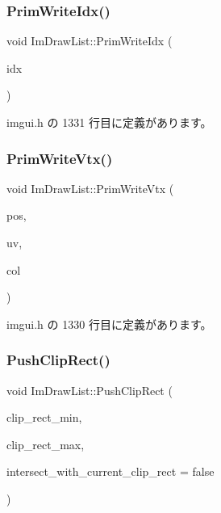 \subsubsection{\texorpdfstring{Prim\+Write\+Idx()}{PrimWriteIdx()}}
{\footnotesize\ttfamily void Im\+Draw\+List\+::\+Prim\+Write\+Idx (\begin{DoxyParamCaption}\item[{\mbox{\hyperlink{imgui_8h_afdc8744a5ac1a968b1ddfa47e13b2fa1}{Im\+Draw\+Idx}}}]{idx }\end{DoxyParamCaption})\hspace{0.3cm}{\ttfamily [inline]}}



 imgui.\+h の 1331 行目に定義があります。

\mbox{\label{struct_im_draw_list_af86de4faf6c8e978fb712ea14c5d0c5f}} 
\subsubsection{\texorpdfstring{Prim\+Write\+Vtx()}{PrimWriteVtx()}}
{\footnotesize\ttfamily void Im\+Draw\+List\+::\+Prim\+Write\+Vtx (\begin{DoxyParamCaption}\item[{const \mbox{\hyperlink{struct_im_vec2}{Im\+Vec2}} \&}]{pos,  }\item[{const \mbox{\hyperlink{struct_im_vec2}{Im\+Vec2}} \&}]{uv,  }\item[{\mbox{\hyperlink{imgui_8h_a118cff4eeb8d00e7d07ce3d6460eed36}{Im\+U32}}}]{col }\end{DoxyParamCaption})\hspace{0.3cm}{\ttfamily [inline]}}



 imgui.\+h の 1330 行目に定義があります。

\mbox{\label{struct_im_draw_list_acb34e2d3708616cae4567f3b4af06962}} 
\subsubsection{\texorpdfstring{Push\+Clip\+Rect()}{PushClipRect()}}
{\footnotesize\ttfamily void Im\+Draw\+List\+::\+Push\+Clip\+Rect (\begin{DoxyParamCaption}\item[{\mbox{\hyperlink{struct_im_vec2}{Im\+Vec2}}}]{clip\+\_\+rect\+\_\+min,  }\item[{\mbox{\hyperlink{struct_im_vec2}{Im\+Vec2}}}]{clip\+\_\+rect\+\_\+max,  }\item[{bool}]{intersect\+\_\+with\+\_\+current\+\_\+clip\+\_\+rect = {\ttfamily false} }\end{DoxyParamCaption})}



